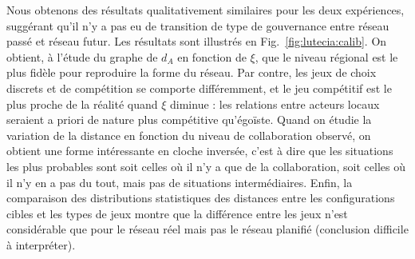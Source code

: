 Nous obtenons des résultats qualitativement similaires pour les deux expériences, suggérant qu'il n'y a pas eu de transition de type de gouvernance entre réseau passé et réseau futur. Les résultats sont illustrés en Fig.~\ref{fig:lutecia:calib}. On obtient, à l'étude du graphe de $d_A$ en fonction de $\xi$, que le niveau régional est le plus fidèle pour reproduire la forme du réseau. Par contre, les jeux de choix discrets et de compétition se comporte différemment, et le jeu compétitif est le plus proche de la réalité quand $\xi$ diminue : les relations entre acteurs locaux seraient a priori de nature plus compétitive qu'égoïste. Quand on étudie la variation de la distance en fonction du niveau de collaboration observé, on obtient une forme intéressante en cloche inversée, c'est à dire que les situations les plus probables sont soit celles où il n'y a que de la collaboration, soit celles où il n'y en a pas du tout, mais pas de situations intermédiaires. Enfin, la comparaison des distributions statistiques des distances entre les configurations cibles et les types de jeux montre que la différence entre les jeux n'est considérable que pour le réseau réel mais pas le réseau planifié (conclusion difficile à interpréter).



